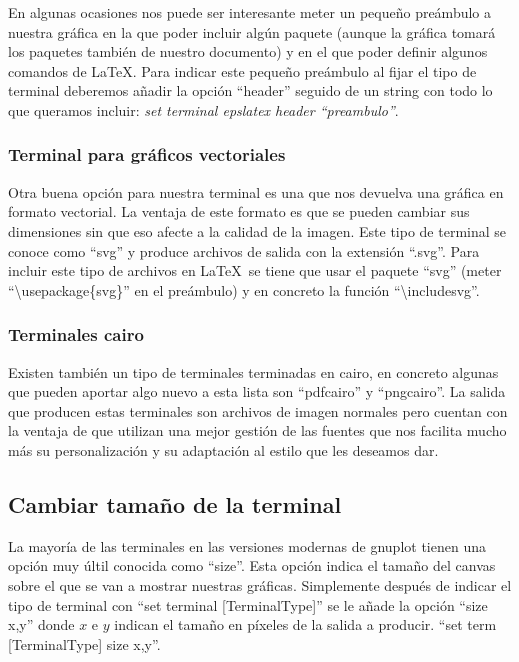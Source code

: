 \documentclass[11pt,a4paper,twoside,pdf]{article}
\numberwithin{equation}{section}
\begin{document}
En algunas ocasiones nos puede ser interesante meter un pequeño preámbulo a nuestra gráfica en la que poder incluir algún paquete (aunque la gráfica tomará los paquetes también de nuestro documento) y en el que poder definir algunos comandos de \LaTeX . Para indicar este pequeño preámbulo al fijar el tipo de terminal deberemos añadir la opción ``header'' seguido de un string con todo lo que queramos incluir: \textit{set terminal epslatex header ``preambulo''}.

\subsubsection{Terminal para gráficos vectoriales}

Otra buena opción para nuestra terminal es una que nos devuelva una gráfica en formato vectorial. La ventaja de este formato es que se pueden cambiar sus dimensiones sin que eso afecte a la calidad de la imagen. Este tipo de terminal se conoce como ``svg'' y produce archivos de salida con la extensión ``.svg''. Para incluir este tipo de archivos en \LaTeX\ se tiene que usar el paquete ``svg'' (meter ``\textbackslash usepackage\{svg\}'' en el preámbulo) y en concreto la función ``\textbackslash includesvg''.

\subsubsection{Terminales cairo}

Existen también un tipo de terminales terminadas en cairo, en concreto algunas que pueden aportar algo nuevo a esta lista son ``pdfcairo'' y ``pngcairo''. La salida que producen estas terminales son archivos de imagen normales pero cuentan con la ventaja de que utilizan una mejor gestión de las fuentes que nos facilita mucho más su personalización y su adaptación al estilo que les deseamos dar.

\subsection{Cambiar tamaño de la terminal}

La mayoría de las terminales en las versiones modernas de gnuplot tienen una opción muy últil conocida como ``size''. Esta opción indica el tamaño del canvas sobre el que se van a mostrar nuestras gráficas. Simplemente después de indicar el tipo de terminal con ``set terminal [TerminalType]'' se le añade la opción ``size x,y'' donde $x$ e $y$ indican el tamaño en píxeles de la salida a producir. ``set term [TerminalType] size x,y''.
\end{document}
